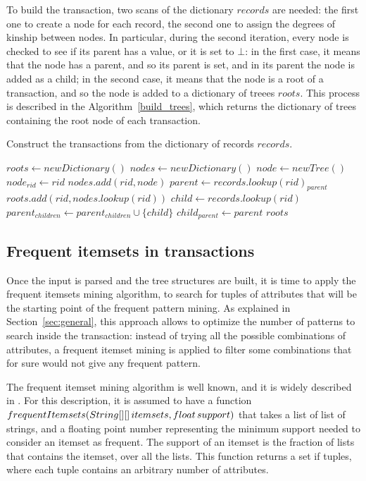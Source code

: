 \documentclass{acm_proc_article-sp-sigmod09}
\begin{document}
To build the transaction, two scans of the dictionary $records$ are needed: the first one to create a node for each record, the second one to assign the degrees of kinship between nodes. In particular, during the second iteration, every node is checked to see if its parent has a value, or it is set to $\bot$: in the first case, it means that the node has a parent, and so its parent is set, and in its parent the node is added as a child; in the second case, it means that the node is a root of a transaction, and so the node is added to a dictionary of treees $roots$. This process is described in the Algorithm~\ref{build_trees}, which returns the dictionary of trees containing the root node of each transaction.

\begin{algorithm}
\caption{Construct the transactions from the dictionary of records $records$.}
\label{build_trees}
\begin{algorithmic}[1]
\State $roots \gets new Dictionary()$
\State $nodes \gets new Dictionary()$
	\State $node \gets new Tree()$ 
	\State $node_{rid} \gets rid$
	\State $nodes.add(rid, node)$
\EndFor
{}
	\State $parent \gets records.lookup(rid)_{parent}$
		\State $roots.add(rid, nodes.lookup(rid))$
	\Else
		\State $child \gets records.lookup(rid)$
		\State $parent_{children} \gets parent_{children} \cup \{child\}$
		\State $child_{parent} \gets parent$
	\EndIf
\EndFor
\Return $roots$
\EndFunction
\end{algorithmic}
\end{algorithm}

\subsection{Frequent itemsets in transactions}
Once the input is parsed and the tree structures are built, it is time to apply the frequent itemsets mining algorithm, to search for tuples of attributes that will be the starting point of the frequent pattern mining. As explained in Section~\ref{sec:general}, this approach allows to optimize the number of patterns to search inside the transaction: instead of trying all the possible combinations of attributes, a frequent itemset mining is applied to filter some combinations that for sure would not give any frequent pattern.

The frequent itemset mining algorithm is well known, and it is widely described in \cite{agrawal1994fast}. For this description, it is assumed to have a function $frequentItemsets(String[][]\, item\-sets, float\, sup\-port)$ that takes a list of list of strings, and a floating point number representing the minimum support needed to consider an itemset as frequent. The support of an itemset is the fraction of lists that contains the itemset, over all the lists. This function returns a set if tuples, where each tuple contains an arbitrary number of attributes.
\end{document}

